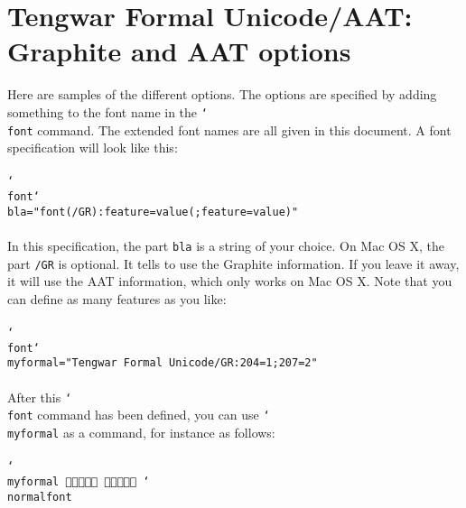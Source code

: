 \documentclass[11pt,a4paper]{article}
\begin{document}
\tableofcontents

\section{Tengwar Formal Unicode/AAT: Graphite and AAT options}



Here are samples of the different options. The options are specified by adding something to the font name in the \texttt{\char`\\font} command. The extended font names are all given in this document. A font specification will look like this:

\paragraph{} \texttt{\char`\\font\char`\\bla="font(/GR):feature=value(;feature=value)"}

\paragraph{} In this specification, the part \texttt{bla} is a string of your choice. On Mac OS X, the part \texttt{/GR} is optional. It tells \XeTeX{} to use the Graphite information. If you leave it away, it will use the AAT information, which only works on Mac OS X. Note that you can define as many features as you like:

\paragraph{} \texttt{\char`\\font\char`\\myformal="Tengwar Formal Unicode/GR:204=1;207=2"}

\paragraph{} After this \texttt{\char`\\font} command has been defined, you can use \texttt{\char`\\myformal} as a command, for instance as follows:

\paragraph{} \texttt{\char`\\myformal   \char`\\normalfont}
\end{document}
